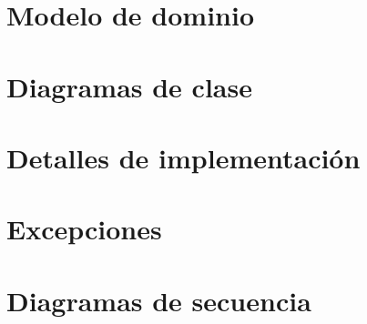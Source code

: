 \documentclass[titlepage,a4paper]{article}
\begin{document}
\section{Modelo de dominio}\label{sec:modelo}

\section{Diagramas de clase}\label{sec:diagramasdeclase}

\section{Detalles de implementación}\label{sec:implementacion}

\section{Excepciones}\label{sec:excepciones}

\section{Diagramas de secuencia}\label{sec:diagramasdesecuencia}
\end{document}
